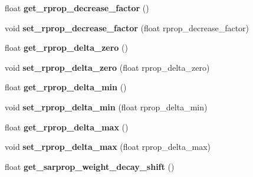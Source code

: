 \begin{DoxyCompactItemize}
\item 
\hypertarget{class_f_a_n_n_1_1neural__net_a2571960b4a4b182c91554e0396f85194}{float {\bfseries get\-\_\-rprop\-\_\-decrease\-\_\-factor} ()}\label{class_f_a_n_n_1_1neural__net_a2571960b4a4b182c91554e0396f85194}

\item 
\hypertarget{class_f_a_n_n_1_1neural__net_a0735aacb325f4a51c4c8aa4f80f0f73a}{void {\bfseries set\-\_\-rprop\-\_\-decrease\-\_\-factor} (float rprop\-\_\-decrease\-\_\-factor)}\label{class_f_a_n_n_1_1neural__net_a0735aacb325f4a51c4c8aa4f80f0f73a}

\item 
\hypertarget{class_f_a_n_n_1_1neural__net_ae9e1381c546d6c62813d69caf5abb06c}{float {\bfseries get\-\_\-rprop\-\_\-delta\-\_\-zero} ()}\label{class_f_a_n_n_1_1neural__net_ae9e1381c546d6c62813d69caf5abb06c}

\item 
\hypertarget{class_f_a_n_n_1_1neural__net_aa5f02864b331a91830207f3978e91eb6}{void {\bfseries set\-\_\-rprop\-\_\-delta\-\_\-zero} (float rprop\-\_\-delta\-\_\-zero)}\label{class_f_a_n_n_1_1neural__net_aa5f02864b331a91830207f3978e91eb6}

\item 
\hypertarget{class_f_a_n_n_1_1neural__net_aa4f101b1a690de5b4a323e99723617f3}{float {\bfseries get\-\_\-rprop\-\_\-delta\-\_\-min} ()}\label{class_f_a_n_n_1_1neural__net_aa4f101b1a690de5b4a323e99723617f3}

\item 
\hypertarget{class_f_a_n_n_1_1neural__net_aa7bf52f98abce080d4f3f0ce399a85c7}{void {\bfseries set\-\_\-rprop\-\_\-delta\-\_\-min} (float rprop\-\_\-delta\-\_\-min)}\label{class_f_a_n_n_1_1neural__net_aa7bf52f98abce080d4f3f0ce399a85c7}

\item 
\hypertarget{class_f_a_n_n_1_1neural__net_a989be6cb626a3f6f5864bae44dd8d6a4}{float {\bfseries get\-\_\-rprop\-\_\-delta\-\_\-max} ()}\label{class_f_a_n_n_1_1neural__net_a989be6cb626a3f6f5864bae44dd8d6a4}

\item 
\hypertarget{class_f_a_n_n_1_1neural__net_acef077dcc6a9914e2f7863960ebb33da}{void {\bfseries set\-\_\-rprop\-\_\-delta\-\_\-max} (float rprop\-\_\-delta\-\_\-max)}\label{class_f_a_n_n_1_1neural__net_acef077dcc6a9914e2f7863960ebb33da}

\item 
\hypertarget{class_f_a_n_n_1_1neural__net_a7ac8e92ebef580e7401d1b19fed0bd54}{float {\bfseries get\-\_\-sarprop\-\_\-weight\-\_\-decay\-\_\-shift} ()}\label{class_f_a_n_n_1_1neural__net_a7ac8e92ebef580e7401d1b19fed0bd54}


\end{DoxyCompactItemize}
